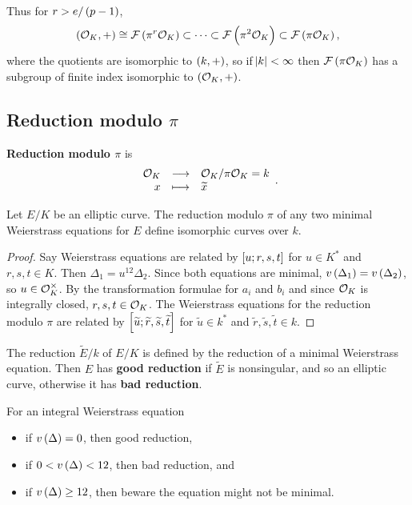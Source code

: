 Thus for $ r > e / \br{p - 1} $,
$$ \br{\OOO_K, +} \cong \FFF\br{\pi^r\OOO_K} \subset \dots \subset \FFF\br{\pi^2\OOO_K} \subset \FFF\br{\pi\OOO_K}, $$
where the quotients are isomorphic to $ \br{k, +} $, so if $ \abs{k} < \infty $ then $ \FFF\br{\pi\OOO_K} $ has a subgroup of finite index isomorphic to $ \br{\OOO_K, +} $.

\subsection{Reduction modulo \texorpdfstring{$ \pi $}{p}}

\begin{notation*}
\textbf{Reduction modulo $ \pi $} is
$$ \function{\OOO_K}{\OOO_K / \pi\OOO_K = k}{x}{\widetilde{x}}. $$
\end{notation*}

\begin{proposition}
Let $ E / K $ be an elliptic curve. The reduction modulo $ \pi $ of any two minimal Weierstrass equations for $ E $ define isomorphic curves over $ k $.
\end{proposition}

\begin{proof}
Say Weierstrass equations are related by $ \sbr{u; r, s, t} $ for $ u \in K^* $ and $ r, s, t \in K $. Then $ \Delta_1 = u^{12}\Delta_2 $. Since both equations are minimal, $ v\br{\Delta_1} = v\br{\Delta_2} $, so $ u \in \mathcal{O}_K^\times $. By the transformation formulae for $ a_i $ and $ b_i $ and since $ \mathcal{O}_K $ is integrally closed, $ r, s, t \in \mathcal{O}_K $. The Weierstrass equations for the reduction modulo $ \pi $ are related by $ \sbr{\widetilde{u}; \widetilde{r}, \widetilde{s}, \widetilde{t}} $ for $ \widetilde{u} \in k^* $ and $ \widetilde{r}, \widetilde{s}, \widetilde{t} \in k $.
\end{proof}

\begin{definition*}
The reduction $ \widetilde{E} / k $ of $ E / K $ is defined by the reduction of a minimal Weierstrass equation. Then $ E $ has \textbf{good reduction} if $ \widetilde{E} $ is nonsingular, and so an elliptic curve, otherwise it has \textbf{bad reduction}.
\end{definition*}

For an integral Weierstrass equation
\begin{itemize}
\item if $ v\br{\Delta} = 0 $, then good reduction,
\item if $ 0 < v\br{\Delta} < 12 $, then bad reduction, and
\item if $ v\br{\Delta} \ge 12 $, then beware the equation might not be minimal.
\end{itemize}

